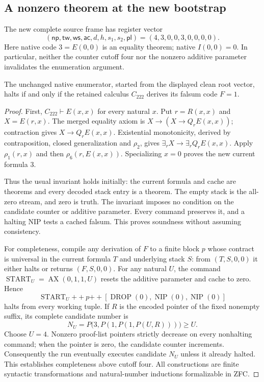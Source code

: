\subsection{A nonzero theorem at the new bootstrap}
The new complete source frame has register vector
\[
 (\mathsf{np},\mathsf{tw},\mathsf{ws},\mathsf{ac},d,h,s_1,s_2,\mathsf{pl})
 =(4,3,0,0,3,0,0,0,0).
\]
Here native code $3=E(0,0)$ is an equality theorem; native $I(0,0)=0$.
In particular, neither the counter cutoff four nor the nonzero additive
parameter invalidates the enumeration argument.

\begin{lemma}
The unchanged native enumerator, started from the displayed clean root
vector, halts if and only if the retained calculus $C_{222}$ derives its
falsum code $F=1$.
\end{lemma}
\begin{proof}
First, $C_{222}\vdash E(x,x)$ for every natural $x$.
Put $r=R(x,x)$ and $X=E(r,x)$. The merged equality axiom is
$X\to(X\to Q_rE(x,x))$; contraction gives
$X\to Q_rE(x,x)$. Existential monotonicity, derived by contraposition,
closed generalization and $\rho_2$, gives
$\exists_rX\to\exists_rQ_rE(x,x)$.
Apply $\rho_1(r,x)$ and then $\rho_6(r,E(x,x))$.
Specializing $x=0$ proves the new current formula $3$.

Thus the usual invariant holds initially: the current formula and cache
are theorems and every decoded stack entry is a theorem. The empty stack
is the all-zero stream, and zero is truth. The invariant imposes no
condition on the candidate counter or additive parameter. Every command
preserves it, and a halting NIP tests a cached falsum. This proves
soundness without assuming consistency.

For completeness, compile any derivation of $F$ to a finite block $p$
whose contract is universal in the current formula $T$ and underlying
stack $S$: from $(T,S,0,0)$ it either halts or returns $(F,S,0,0)$.
For any natural $U$, the command
$\operatorname{START}_U=\operatorname{AX}(0,1,1,U)$ resets the additive
parameter and cache to zero. Hence
\[
 \operatorname{START}_U\mathbin{+\!+}p\mathbin{+\!+}
 [\operatorname{DROP}(0),\operatorname{NIP}(0),\operatorname{NIP}(0)]
\]
halts from every working tuple. If $R$ is the encoded pointer of the fixed
nonempty suffix, its complete candidate number is
\[
 N_U=P\bigl(3,P(1,P(1,P(U,R)))\bigr)\geq U.
\]
Choose $U=4$. Nonzero proof-list pointers strictly decrease on every
nonhalting command; when the pointer is zero, the candidate counter
increments. Consequently the run eventually executes candidate $N_U$
unless it already halted. This establishes completeness above cutoff four.
All constructions are finite syntactic transformations and natural-number
inductions formalizable in ZFC.
\end{proof}

